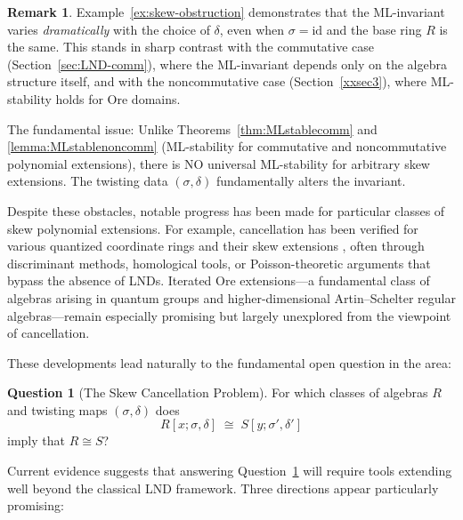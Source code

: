 \documentclass{amsart}
\theoremstyle{plain}
\numberwithin{theorem}{section}
\numberwithin{equation}{theorem}
\theoremstyle{definition}
\newtheorem{remark}[theorem]{Remark}
\newtheorem{question}[theorem]{Question}
\begin{document}
\begin{remark}
Example~\ref{ex:skew-obstruction} demonstrates that the ML-invariant varies \emph{dramatically} with the choice of $\delta$, even when $\sigma = \text{id}$ and the base ring $R$ is the same. This stands in sharp contrast with the commutative case (Section~\ref{sec:LND-comm}), where the ML-invariant depends only on the algebra structure itself, and with the noncommutative case (Section~\ref{xxsec3}), where ML-stability holds for Ore domains.

The fundamental issue: Unlike Theorems~\ref{thm:MLstablecomm} and \ref{lemma:MLstablenoncomm} (ML-stability for commutative and noncommutative polynomial extensions), there is NO universal ML-stability for arbitrary skew extensions. The twisting data $(\sigma,\delta)$ fundamentally alters the invariant.
\end{remark}




Despite these obstacles, notable progress has been made for particular classes of skew polynomial extensions. For example, cancellation has been verified for various quantized coordinate rings and their skew extensions \cite{LMZ,LeWZ,TZZ}, often through discriminant methods, homological tools, or Poisson-theoretic arguments that bypass the absence of LNDs. Iterated Ore extensions—a fundamental class of algebras arising in quantum groups and higher-dimensional Artin--Schelter regular algebras—remain especially promising but largely unexplored from the viewpoint of cancellation.


These developments lead naturally to the fundamental open question in the area:

\begin{question}[The Skew Cancellation Problem]
\label{q:skew-cancel}
For which classes of algebras $R$ and twisting maps $(\sigma,\delta)$ does
\[
    R[x;\sigma,\delta] \;\cong\; S[y;\sigma',\delta']
\]
imply that $R \cong S$?
\end{question}




Current evidence suggests that answering Question~\ref{q:skew-cancel} will require tools extending well beyond the classical LND framework. Three directions appear particularly promising:
\end{document}
